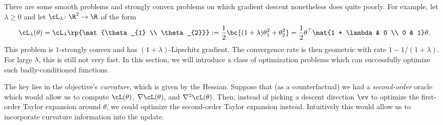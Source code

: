 \documentclass[../../book-main.tex]{subfiles}
\begin{document}
There are some smooth problems and strongly convex problems on which gradient descent nonetheless does quite poorly. For example, let \(\lambda \geq 0\) and let \(\cL_{\lambda} \colon \R^{2} \to \R\) of the form 
\begin{equation}
    \cL_{\lambda}(\theta) = \cL_{\lambda}\rp{\mat{\theta_{1} \\ \theta_{2}}} := \frac{1}{2}\bc{(1 + \lambda) \theta_{1}^{2} + \theta_{2}^{2}} = \frac{1}{2}\theta^{\top}\mat{1 + \lambda & 0 \\ 0 & 1}\theta.
\end{equation}
This problem is \(1\)-strongly convex and has \((1 + \lambda)\)-Lipschitz gradient. The convergence rate is then geometric with rate \(1 - 1/(1 + \lambda)\). For large \(\lambda\), this is still not very fast. In this section, we will introduce a class of optimization problems which can successfully optimize such badly-conditioned functions.

The key lies in the objective's \textit{curvature}, which is given by the Hessian. Suppose that (as a counterfactual) we had a \textit{second-order} oracle which would allow us to compute \(\cL(\theta)\), \(\nabla \cL(\theta)\), and \(\nabla^{2}\cL(\theta)\). Then, instead of picking a descent direction \(\vv\) to optimize the first-order Taylor expansion around \(\theta\), we could optimize the second-order Taylor expansion instead. Intuitively this would allow us to incorporate curvature information into the update.
\end{document}
